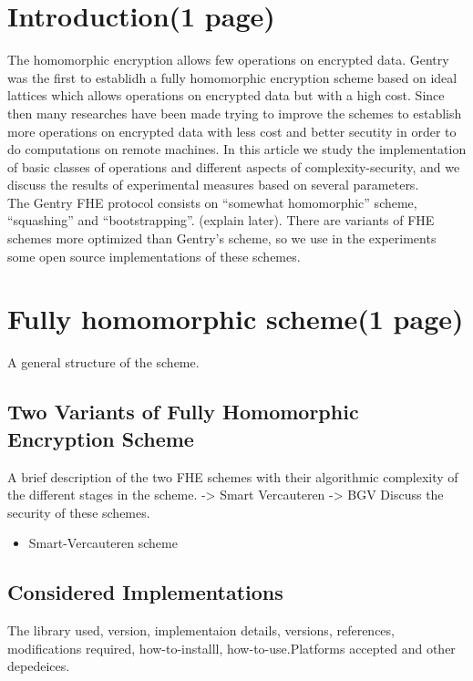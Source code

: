 \documentclass{acm_proc_article-sp}
\begin{document}

\section{Introduction(1 page)}
The homomorphic encryption allows few operations on encrypted data. Gentry was the first to establidh a fully homomorphic encryption scheme based on ideal lattices which allows operations on encrypted data
 but with a high cost. Since then many researches have been made trying to improve the schemes to establish more operations on encrypted data with less cost and better secutity in order to do computations on remote machines. 
In this article we study the implementation of basic classes of operations and different aspects of 
complexity-security, and we discuss the results of experimental measures based on several parameters.\\
The Gentry FHE protocol consists on ``somewhat homomorphic'' scheme, ``squashing'' and ``bootstrapping''. (explain later). 
There are variants of FHE schemes more optimized than Gentry's scheme, so we use in the experiments some open source implementations of these schemes.
\section{Fully homomorphic scheme(1 page)}
A general structure of the scheme.
\subsection{Two Variants of Fully Homomorphic Encryption Scheme}
A brief description of the two FHE schemes with their algorithmic complexity of the different stages in the scheme. 
-> Smart Vercauteren
-> BGV
Discuss the security of these schemes.



\begin{itemize}
\item Smart-Vercauteren scheme


\end{itemize}
\subsection{Considered Implementations}

The library used, version, implementaion details, versions, references, modifications required, how-to-installl, how-to-use.Platforms accepted and other depedeices.
\end{document}
